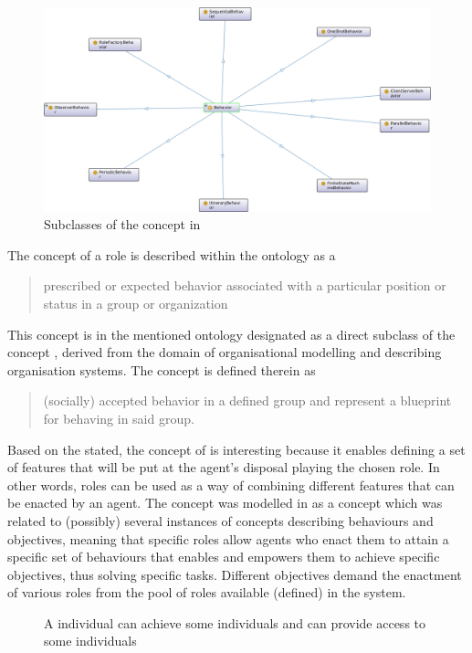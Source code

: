 \begin{figure}
    \centering
    \includegraphics[width=0.84\linewidth]{Deliverables/Phase 1.1/Figures/Behaviours in ooooaflsmas.png}
    \caption{Subclasses of the  concept in }
    \label{fig:behaviour subclasses in ooooaflsmas}
\end{figure}

 The concept of a role is described within the  ontology as a \blockquote{prescribed or expected behavior associated with a particular position or status in a group or organization}. This concept is in the mentioned ontology designated as a direct subclass of the concept , derived from the domain of organisational modelling and describing organisation systems. The  concept is defined therein as \blockquote{(socially) accepted behavior in a defined group and  represent a blueprint for behaving in said group.} Based on the stated, the concept of  is interesting because it enables defining a set of features that will be put at the agent's disposal playing the chosen role. In other words, roles can be used as a way of combining different features that can be enacted by an agent. The  concept was modelled in \cite{okresaduric2019OrganizationalModelingLargeScale} as a concept which was related to (possibly) several instances of concepts describing behaviours and objectives, meaning that specific roles allow agents who enact them to attain a specific set of behaviours
%
that enables and empowers them to achieve specific objectives, thus solving specific tasks. Different objectives demand the enactment of various roles from the pool of roles available (defined) in the system. 

\begin{figure}
    \centering
    
    \caption{A  individual can achieve some  individuals and can provide access to some  individuals}
    \label{fig:roles achieve objectives and enable knowledge}
\end{figure}

